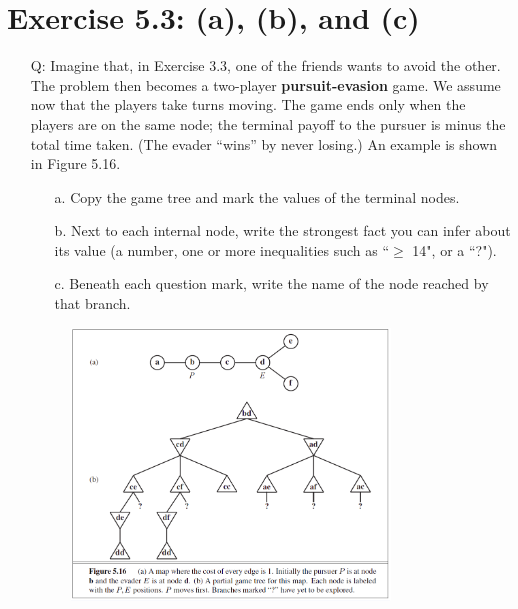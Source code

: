\documentclass{article}
\begin{document}
\section{Exercise 5.3: (a), (b), and (c)}
\begin{itemize}
\item[Q:]Imagine that, in Exercise 3.3, one of the friends wants to avoid the other. The problem then becomes a two-player \textbf{pursuit-evasion} game. We assume now that the players take turns moving. The game ends only when the players are on the same node; the terminal payoff to the pursuer is minus the total time taken. (The evader ``wins'' by never losing.) An example is shown in Figure 5.16.
\begin{itemize}
\item[a.]Copy the game tree and mark the values of the terminal nodes.
\item[b.]Next to each internal node, write the strongest fact you can infer about its value (a number, one or more inequalities such as ``$\geq$ 14", or a ``?").
\item[c.]Beneath each question mark, write the name of the node reached by that branch.
\end{itemize}

\begin{figure}[h!]
\centering
\includegraphics[width=0.8\textwidth]{fig5_16.png}
\end{figure}


\end{itemize}
\end{document}

